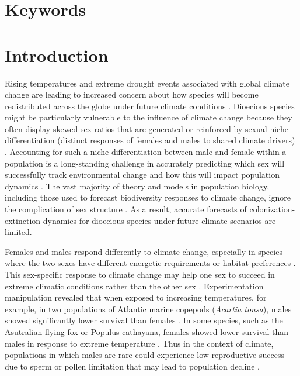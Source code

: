 \documentclass[11pt]{article}
\begin{document}
\section*{Keywords}

\newpage
\section*{Introduction}
Rising temperatures and extreme drought events associated with global climate change are leading to increased concern about how species will become redistributed across the globe under future climate conditions \citep{bertrand2011changes,gamelon2017interactions}.
Dioecious species might be particularly vulnerable to the influence of climate change because they often display skewed sex ratios that are generated or reinforced by sexual niche differentiation (distinct responses of females and males to shared climate drivers) \citep{Tognetti2012}. 
Accounting for such a niche differentiation between male and female within a population is a long-standing challenge in accurately predicting which sex will successfully track environmental change and how this will impact population dynamics \citep{jones1999sex,gissi2023exploring}. 
The vast majority of theory and models in population biology, including those used to forecast biodiversity responses to climate change, ignore the complication of sex structure \citep{pottier2021sexual,ellis2017does}.
As a result, accurate forecasts of colonization-extinction dynamics for dioecious species under future climate scenarios are limited. 

Females and males respond differently to climate change, especially in species where the two sexes have different energetic requirements or habitat preferences \citep{gissi2023exploring,gissi2023sex,hultine2016climate}. 
This sex-specific response to climate change may help one sex to succeed in extreme climatic conditions rather than the other sex \citep{zhao2012sex, burli2022environmental}.
Experimentation manipulation revealed that when exposed to increasing temperatures, for example, in two populations of Atlantic marine copepods (\textit{Acartia tonsa}), males showed significantly lower survival than females \citep{sasaki2019complex}. 
In some species, such as the Asutralian flying fox or Populus cathayana, females showed lower survival than males in response to extreme temperature \citep{welbergen2008climate,zhao2012sex}.
Thus in the context of climate, populations in which males are rare could experience low reproductive success due to sperm or pollen limitation that may lead to population decline \citep{eberhart2017sex}.
\end{document}
